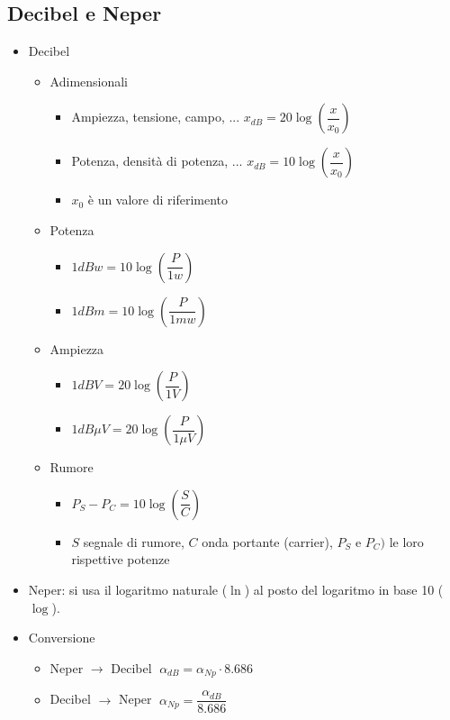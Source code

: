 \documentclass{article}
\begin{document}
\subsection{Decibel e Neper}
\begin{itemize}
	\item Decibel
	      \begin{itemize}
		      \item Adimensionali
		            \begin{itemize}
			            \item Ampiezza, tensione, campo, ... \( x_{dB} = 20 \log\left(\dfrac{x}{x_0}\right) \)
			            \item Potenza, densità di potenza, ... \( x_{dB} = 10 \log\left(\dfrac{x}{x_0}\right) \)
			            \item \(x_0\) è un valore di riferimento
		            \end{itemize}
		      \item Potenza
		            \begin{itemize}
			            \item \(1 dBw = 10 \log\left(\dfrac{P}{1w}\right) \)
			            \item \(1 dBm = 10 \log\left(\dfrac{P}{1mw}\right) \)
		            \end{itemize}
		      \item Ampiezza
		            \begin{itemize}
			            \item \(1 dBV = 20 \log\left(\dfrac{P}{1V}\right) \)
			            \item \(1 dB \mu V = 20 \log\left(\dfrac{P}{1 \mu V}\right) \)
		            \end{itemize}
		      \item Rumore
		            \begin{itemize}
			            \item \(P_S - P_C = 10 \log\left( \dfrac{S}{C} \right) \)
			            \item \(S\) segnale di rumore, \(C\) onda portante (carrier), \(P_S\) e \(P_C)\) le loro rispettive potenze
		            \end{itemize}
	      \end{itemize}
	\item Neper: si usa il logaritmo naturale (\( \ln \)) al posto del logaritmo in base 10 (\(\log\)).
	\item Conversione
	      \begin{itemize}
		      \item Neper \(\rightarrow\) Decibel \( \; \alpha_{dB} = \alpha_{Np} \cdot 8.686 \)
		      \item Decibel \(\rightarrow\) Neper \( \; \alpha_{Np} = \dfrac{\alpha_{dB}}{8.686} \)
	      \end{itemize}
\end{itemize}
\end{document}
